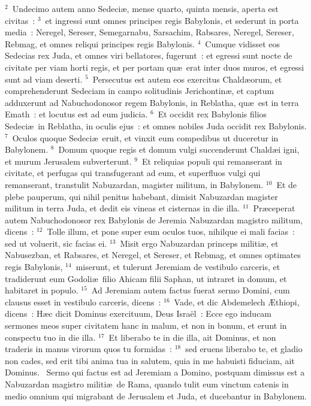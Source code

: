 ${}^{2}$~Undecimo autem anno Sedeci\ae , mense quarto, quinta mensis, aperta est civitas~:
${}^{3}$~et ingressi sunt omnes principes regis Babylonis, et sederunt in porta media~: Neregel, Sereser, Semegarnabu, Sarsachim, Rabsares, Neregel, Sereser, Rebmag, et omnes reliqui principes regis Babylonis.
${}^{4}$~Cumque vidisset eos Sedecias rex Juda, et omnes viri bellatores, fugerunt~: et egressi sunt nocte de civitate per viam horti regis, et per portam qu\ae\ erat inter duos muros, et egressi sunt ad viam deserti.
${}^{5}$~Persecutus est autem eos exercitus Chald\ae orum, et comprehenderunt Sedeciam in campo solitudinis Jerichontin\ae , et captum adduxerunt ad Nabuchodonosor regem Babylonis, in Reblatha, qu\ae\ est in terra Emath~: et locutus est ad eum judicia.
${}^{6}$~Et occidit rex Babylonis filios Sedeci\ae\ in Reblatha, in oculis ejus~: et omnes nobiles Juda occidit rex Babylonis.
${}^{7}$~Oculos quoque Sedeci\ae\ eruit, et vinxit eum compedibus ut duceretur in Babylonem.
${}^{8}$~Domum quoque regis et domum vulgi succenderunt Chald\ae i igni, et murum Jerusalem subverterunt.
${}^{9}$~Et reliquias populi qui remanserant in civitate, et perfugas qui transfugerant ad eum, et superfluos vulgi qui remanserant, transtulit Nabuzardan, magister militum, in Babylonem.
${}^{10}$~Et de plebe pauperum, qui nihil penitus habebant, dimisit Nabuzardan magister militum in terra Juda, et dedit eis vineas et cisternas in die illa.
${}^{11}$~Pr\ae ceperat autem Nabuchodonosor rex Babylonis de Jeremia Nabuzardan magistro militum, dicens~:
${}^{12}$~Tolle illum, et pone super eum oculos tuos, nihilque ei mali facias~: sed ut voluerit, sic facias ei.
${}^{13}$~Misit ergo Nabuzardan princeps militi\ae , et Nabusezban, et Rabsares, et Neregel, et Sereser, et Rebmag, et omnes optimates regis Babylonis,
${}^{14}$~miserunt, et tulerunt Jeremiam de vestibulo carceris, et tradiderunt eum Godoli\ae\ filio Ahicam filii Saphan, ut intraret in domum, et habitaret in populo.
${}^{15}$~Ad Jeremiam autem factus fuerat sermo Domini, cum clausus esset in vestibulo carceris, dicens~:
${}^{16}$~Vade, et dic Abdemelech \AE thiopi, dicens~: H\ae c dicit Dominus exercituum, Deus Isra\"el~: Ecce ego inducam sermones meos super civitatem hanc in malum, et non in bonum, et erunt in conspectu tuo in die illa.
${}^{17}$~Et liberabo te in die illa, ait Dominus, et non traderis in manus virorum quos tu formidas~:
${}^{18}$~sed eruens liberabo te, et gladio non cades, sed erit tibi anima tua in salutem, quia in me habuisti fiduciam, ait Dominus.
~Sermo qui factus est ad Jeremiam a Domino, postquam dimissus est a Nabuzardan magistro militi\ae\ de Rama, quando tulit eum vinctum catenis in medio omnium qui migrabant de Jerusalem et Juda, et ducebantur in Babylonem.
